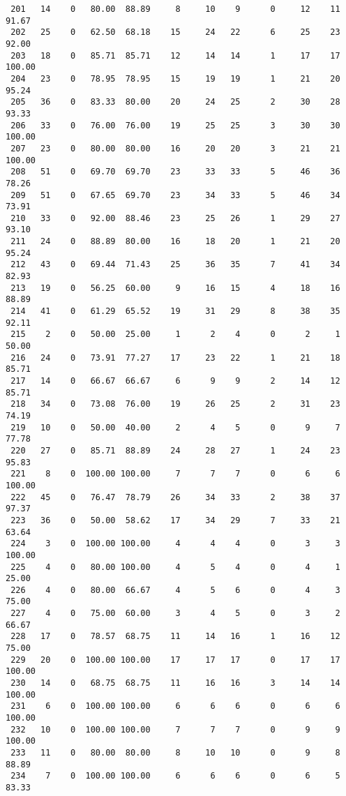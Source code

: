 \begin{verbatim}
 201   14    0   80.00  88.89     8     10    9      0     12    11    91.67
 202   25    0   62.50  68.18    15     24   22      6     25    23    92.00
 203   18    0   85.71  85.71    12     14   14      1     17    17   100.00
 204   23    0   78.95  78.95    15     19   19      1     21    20    95.24
 205   36    0   83.33  80.00    20     24   25      2     30    28    93.33
 206   33    0   76.00  76.00    19     25   25      3     30    30   100.00
 207   23    0   80.00  80.00    16     20   20      3     21    21   100.00
 208   51    0   69.70  69.70    23     33   33      5     46    36    78.26
 209   51    0   67.65  69.70    23     34   33      5     46    34    73.91
 210   33    0   92.00  88.46    23     25   26      1     29    27    93.10
 211   24    0   88.89  80.00    16     18   20      1     21    20    95.24
 212   43    0   69.44  71.43    25     36   35      7     41    34    82.93
 213   19    0   56.25  60.00     9     16   15      4     18    16    88.89
 214   41    0   61.29  65.52    19     31   29      8     38    35    92.11
 215    2    0   50.00  25.00     1      2    4      0      2     1    50.00
 216   24    0   73.91  77.27    17     23   22      1     21    18    85.71
 217   14    0   66.67  66.67     6      9    9      2     14    12    85.71
 218   34    0   73.08  76.00    19     26   25      2     31    23    74.19
 219   10    0   50.00  40.00     2      4    5      0      9     7    77.78
 220   27    0   85.71  88.89    24     28   27      1     24    23    95.83
 221    8    0  100.00 100.00     7      7    7      0      6     6   100.00
 222   45    0   76.47  78.79    26     34   33      2     38    37    97.37
 223   36    0   50.00  58.62    17     34   29      7     33    21    63.64
 224    3    0  100.00 100.00     4      4    4      0      3     3   100.00
 225    4    0   80.00 100.00     4      5    4      0      4     1    25.00
 226    4    0   80.00  66.67     4      5    6      0      4     3    75.00
 227    4    0   75.00  60.00     3      4    5      0      3     2    66.67
 228   17    0   78.57  68.75    11     14   16      1     16    12    75.00
 229   20    0  100.00 100.00    17     17   17      0     17    17   100.00
 230   14    0   68.75  68.75    11     16   16      3     14    14   100.00
 231    6    0  100.00 100.00     6      6    6      0      6     6   100.00
 232   10    0  100.00 100.00     7      7    7      0      9     9   100.00
 233   11    0   80.00  80.00     8     10   10      0      9     8    88.89
 234    7    0  100.00 100.00     6      6    6      0      6     5    83.33

\end{verbatim}

